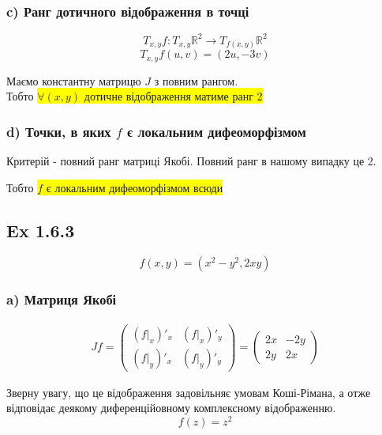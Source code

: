 \documentclass[10pt, a4paper]{article} %
\newcommand{\R}{\mathbb{R}}
\begin{document}
\subsubsection*{c) Ранг дотичного відображення в точці}
\[T_{x,y}f : T_{x,y}\R^2 \to T_{f(x,y)}\R^2\]
\[T_{x,y}f(u,v) = (2u, -3v)\]

Маємо константну матрицю $J$ з повним рангом. \\
Тобто \colorbox{yellow}{$\forall (x,y)$ дотичне відображення матиме ранг 2}

\subsubsection*{d) Точки, в яких $f$ є локальним дифеоморфізмом}
Критерій - повний ранг матриці Якобі.
Повний ранг в нашому випадку це 2.

Тобто \colorbox{yellow}{$f$ є локальним дифеоморфізмом всюди}

\subsection*{Ex 1.6.3}
\[f(x,y) = (x^2-y^2, 2xy)\]
\subsubsection*{a) Матриця Якобі}
\begin{align*}
    Jf = \begin{pmatrix}
        (f|_x)'_x & (f|_x)'_y\\
        (f|_y)'_x & (f|_y)'_y
    \end{pmatrix} 
    = \begin{pmatrix}
        2x & -2y\\
        2y & 2x
    \end{pmatrix}
\end{align*}

Зверну увагу, що це відображення задовільняє умовам Коші-Рімана, а отже відповідає деякому диференційовному комплексному відображенню.
\[f(z)=z^2\]
\end{document}
